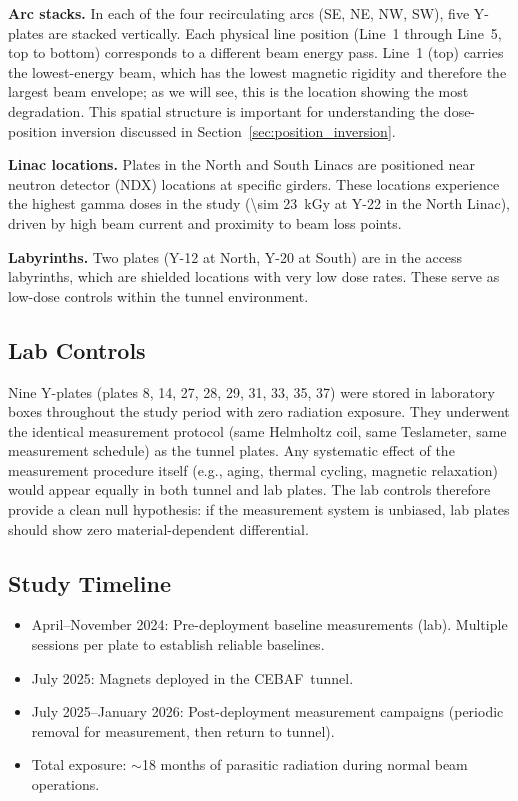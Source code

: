 \documentclass[11pt,letterpaper]{article}
\newcommand{\CEBAF}{CEBAF}
\begin{document}
\textbf{Arc stacks.} In each of the four recirculating arcs (SE, NE, NW, SW),
five Y-plates are stacked vertically. Each physical line position (Line~1
through Line~5, top to bottom) corresponds to a different beam energy pass.
Line~1 (top) carries the lowest-energy beam, which has the lowest magnetic
rigidity and therefore the largest beam envelope; as we will see, this is the location showing the
most degradation. This spatial structure is important for understanding the
dose-position inversion discussed in Section~\ref{sec:position_inversion}.

\textbf{Linac locations.} Plates in the North and South Linacs are positioned
near neutron detector (NDX) locations at specific girders. These locations
experience the highest gamma doses in the study (\SI{\sim 23}{kGy} at Y-22 in
the North Linac), driven by high beam current and proximity to beam loss
points.

\textbf{Labyrinths.} Two plates (Y-12 at North, Y-20 at South) are in the
access labyrinths, which are shielded locations with very low dose rates. These serve as
low-dose controls within the tunnel environment.

\subsection{Lab Controls}

Nine Y-plates (plates 8, 14, 27, 28, 29, 31, 33, 35, 37) were stored in
laboratory boxes throughout the study period with zero radiation exposure. They
underwent the identical measurement protocol (same Helmholtz coil,
same Teslameter, same measurement schedule) as the tunnel plates. Any
systematic effect of the measurement procedure itself (e.g., aging, thermal
cycling, magnetic relaxation) would appear equally in both tunnel and lab
plates. The lab controls therefore provide a clean null hypothesis: if the
measurement system is unbiased, lab plates should show zero
material-dependent differential.

\subsection{Study Timeline}

\begin{itemize}
    \item April--November 2024: Pre-deployment baseline measurements
    (lab). Multiple sessions per plate to establish reliable baselines.
    \item July 2025: Magnets deployed in the \CEBAF~tunnel.
    \item July 2025--January 2026: Post-deployment measurement
    campaigns (periodic removal for measurement, then return to tunnel).
    \item Total exposure: $\sim$18 months of parasitic radiation
    during normal beam operations.
\end{itemize}
\end{document}
